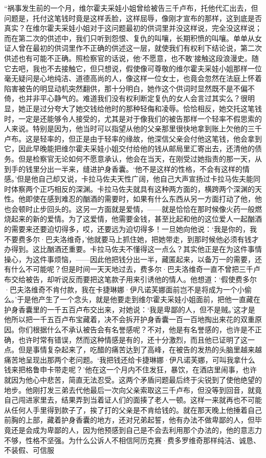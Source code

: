 \par “祸事发生前的一个月，维尔霍夫采娃小姐曾给被告三千卢布，托他代汇出去，但问题是，托付这笔钱时竟是这样丢脸，这样屈辱，像刚才宣布的那样，这到底是否真实？在维尔霍夫采娃小姐对于这问题最初的供词里并没这样说，完全没这样说；而在第二次的供述中，我们只听到怨恨、复仇的叫嚷，长期积愤的叫嚷。单单从女证人曾在最初的供词里作不正确的供述这一层，就使我们有权利下结论说，第二次供述也有可能不正确。照检察官的话说，他‘不愿意，也不敢’接触这段浪漫史。随它去吧，我也不去接触它，但只想说，假使像可尊敬的维尔霍夫采娃小姐那样一位毫无疑问是心地纯洁、道德高尚的人，像这样一位女士，也竟会忽然在法庭上怀着陷害被告的明显动机突然翻供，那十分明白，她作这个供词时显然既不是不偏不倚，也并非平心静气的。难道我们没有权利断定复仇的女人会言过其实么？很明显，她正是过分夸大了她交钱给他时的那种轻侮和凌辱。恰恰相反，她交托这笔钱时，一定是还能够令人接受的，尤其是对于像我们的被告那样一个轻率不假思索的人来说。特别是因为，他当时可以指望从他的父亲那里很快地拿到账上欠他的三千卢布。这是轻率的，但正是由于轻率的缘故，他深信父亲会付他这笔钱，他会拿到它，因此早晚能把维尔霍夫采娃小姐交付给他的钱从邮局里汇寄出去，还清他的债务。但是检察官无论如何不愿意承认，他会在当天，在刚受过她指责的那一天，从到手的钱里分出一半来，缝进护身香囊。‘他不是这样的性格，不会有这样的情感。’但是他自己却又说，卡拉马佐夫天性广阔，他自己大声宣扬过卡拉马佐夫能同时体察两个正巧相反的深渊。卡拉马佐夫就具有这种两方面的，横跨两个深渊的天性。他即使在感到难忍的酗酒的需要时，如果有什么东西从另一方面打动了他，他也会顿时止步回头的。这另一方面就是爱情，——就是恰恰在那时候像火药一般燃烧起来的新的爱情。为了这爱情，他需要金钱，甚至比起和他的这位爱人一起酗酒的需要来还要迫切得多，哎，还要远为迫切得多！一旦她向他说：‘我是你的，我不要费多尔·巴夫洛维奇，’他就要马上抓住她，把她带走，到那时候他必须有钱才办得到。这比酗酒还重要。卡拉马佐夫不懂得这一点么？其实他正是在为这件事情操心，为这件事烦恼，——因此他把钱分出一半，藏匿起来，以备万一的需要，还有什么不可能呢？但是时间一天天地过去，费多尔·巴夫洛维奇一直不曾把三千卢布交给被告，却听说反而要把这笔款子用来引诱他的情人。他想道：‘假使费多尔·巴夫洛维奇不肯付款，我在卡捷琳娜·伊凡诺芙娜面前岂不是将成为一个小偷么。’于是他产生了一个念头，就是他要走到维尔霍夫采娃小姐面前，把他一直藏在护身香囊里的一千五百卢布交出来，对她说：‘我是卑鄙的人，但不是贼。’这才是他所以把一千五百卢布宝藏着，决不会拆开护身香囊一百一百地掏出来花的双重原因。你们根据什么不承认被告会有名誉感呢？不对，他是有名誉感的，也许是不正确，也许时常有错误，然而这种情感是有的，还十分激烈，而且他已证明了这一点。但是事情复杂起来了，吃醋的痛苦达到了高峰，在被告的发热的头脑里越来越痛苦地呈现出那两个老问题。‘我把钱还给卡捷琳娜·伊凡诺芙娜，可叫我拿什么钱来把格鲁申卡带走呢？’他在这一个月内不住发狂，暴饮，在酒店里闹事，也许就因为他心中悲苦，简直无法忍受。这两个矛盾问题最后终于尖锐到了使他绝望的地步。他刚打发三弟去代他最后一次向父亲索取这三千卢布，但没等到回音，就竟自己闯进家里去，结果弄到当着证人们的面揍了老人一顿。这样一来就再也不可能从任何人手里得到款子了，挨了打的父亲是不肯给钱的。就在那天晚上他捶着自己前胸的上部，藏着护身香囊的地方，还对兄弟起誓，他有办法不做卑鄙的人，但毕竟还是会成为卑鄙的人，因为他预感到自己是不会去利用那个办法的，他的意志力不够，性格不坚强。为什么公诉人不相信阿历克赛·费多罗维奇那样纯洁、诚恳、不装假、可信服